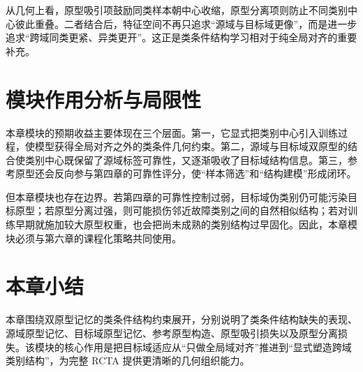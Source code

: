 从几何上看，原型吸引项鼓励同类样本朝中心收缩，原型分离项则防止不同类别中心彼此重叠。二者结合后，特征空间不再只追求“源域与目标域更像”，而是进一步追求“跨域同类更紧、异类更开”。这正是类条件结构学习相对于纯全局对齐的重要补充。

\section{模块作用分析与局限性}
本章模块的预期收益主要体现在三个层面。第一，它显式把类别中心引入训练过程，使模型获得全局对齐之外的类条件几何约束。第二，源域与目标域双原型的结合使类别中心既保留了源域标签可靠性，又逐渐吸收了目标域结构信息。第三，参考原型还会反向参与第四章的可靠性评分，使“样本筛选”和“结构建模”形成闭环。

但本章模块也存在边界。若第四章的可靠性控制过弱，目标域伪类别仍可能污染目标原型；若原型分离过强，则可能损伤邻近故障类别之间的自然相似结构；若对训练早期就施加较大原型权重，也会把尚未成熟的类别结构过早固化。因此，本章模块必须与第六章的课程化策略共同使用。

\section{本章小结}
本章围绕双原型记忆的类条件结构约束展开，分别说明了类条件结构缺失的表现、源域原型记忆、目标域原型记忆、参考原型构造、原型吸引损失以及原型分离损失。该模块的核心作用是把目标域适应从“只做全局域对齐”推进到“显式塑造跨域类别结构”，为完整 RCTA 提供更清晰的几何组织能力。
